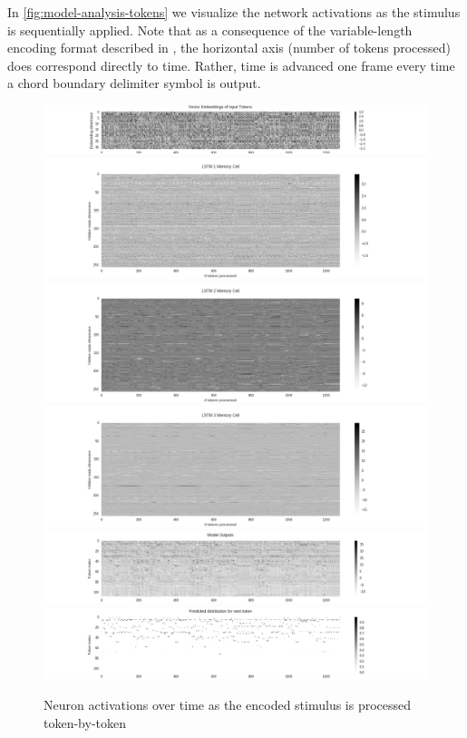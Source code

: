 \documentclass[dissertation.tex]{subfiles}
\begin{document}
In \autoref{fig:model-analysis-tokens} we visualize the network activations as
the stimulus is sequentially applied. Note that as a consequence of the
variable-length encoding format described in , the horizontal axis
(number of tokens processed) does correspond directly to time. Rather, time
is advanced one frame every time a chord boundary delimiter symbol is output.

\begin{figure}[htpb]
    \centering
    \includegraphics[width=1.0\linewidth]{Figures/model-analysis-tokens-0.png}
    \includegraphics[width=1.0\linewidth]{Figures/model-analysis-tokens-1.png}
    \includegraphics[width=1.0\linewidth]{Figures/model-analysis-tokens-2.png}
    \includegraphics[width=1.0\linewidth]{Figures/model-analysis-tokens-3.png}
    \includegraphics[width=1.0\linewidth]{Figures/model-analysis-tokens-4.png}
    \includegraphics[width=1.0\linewidth]{Figures/model-analysis-tokens-5.png}
    \caption{Neuron activations over time as the encoded stimulus is processed token-by-token}
    \label{fig:model-analysis-tokens}
\end{figure}
\end{document}
